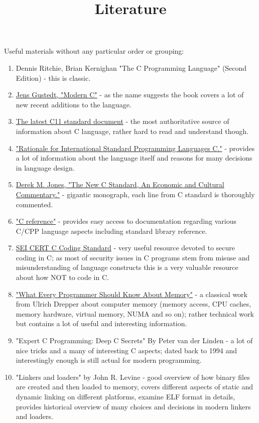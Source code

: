 \documentclass{article}
\begin{document}
\title{Literature}
{\Large Useful materials without any particular order or grouping:}
\begin{enumerate}
\item Dennis Ritchie, Brian Kernighan "The C Programming Language" (Second Edition) - this is classic.
\item \href{https://gforge.inria.fr/frs/download.php/latestfile/5298/ModernC.pdf}{Jens Gustedt, "Modern C"} - as the name suggests the book covers a lot of new recent additions to the language.
\item \href{http://www.open-std.org/jtc1/sc22/wg14/www/docs/n1548.pdf}{The latest C11 standard document} - the most authoritative source of information about C language, rather hard to read and understand though.
\item \href{http://www.open-std.org/jtc1/sc22/wg14/www/C99RationaleV5.10.pdf}{"Rationale for International Standard Programming Languages C."} - provides a lot of information about the language itself and reasons for many decisions in language design.
\item \href{http://people.ece.cornell.edu/land/courses/ece4760/cbook1_1.pdf}{Derek M. Jones, "The New C Standard, An Economic and Cultural Commentary."} - gigantic monograph, each line from C standard is thoroughly commented.
\item \href{http://en.cppreference.com/w/c}{"C reference"} - provides easy access to documentation regarding various C/CPP language aspects including standard library reference.
\item \href{https://www.securecoding.cert.org/confluence/display/c/SEI+CERT+C+Coding+Standard}{SEI CERT C Coding Standard} - very useful resource devoted to secure coding in C; as most of security issues in C programs stem from misuse and misunderstanding of language constructs this is a very valuable resource about how NOT to code in C.
\item \href{https://www.akkadia.org/drepper/cpumemory.pdf}{"What Every Programmer Should Know About Memory"} - a classical work from Ulrich Drepper about computer memory (memory access, CPU caches, memory hardware, virtual memory, NUMA and so on); rather technical work but contains a lot of useful and interesting information.
\item "Expert C Programming: Deep C Secrets" By Peter van der Linden - a lot of nice tricks and a many of interesting C aspects; dated back to 1994 and interestingly enough is still actual for modern programming.
\item "Linkers and loaders" by John R. Levine - good overview of how binary files are created and then loaded to memory, covers different aspects of static and dynamic linking on different platforms, examine ELF format in details, provides historical overview of many choices and decisions in modern linkers and loaders.

\end{enumerate}
\end{document}
